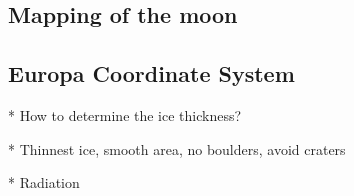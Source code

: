 \subsection{Mapping of the moon}

\subsection{Europa Coordinate System}

* How to determine the ice thickness?

* Thinnest ice, smooth area, no boulders, avoid craters

* Radiation
